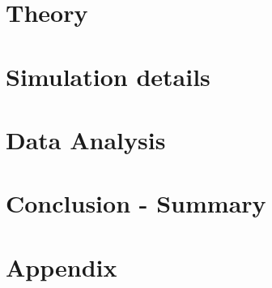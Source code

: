 \documentclass[a4paper, 11pt]{scrreprt}
\begin{document}
	
	\renewcommand{\subsectionautorefname}{section\negthinspace}
	\renewcommand{\subsubsectionautorefname}{section\negthinspace}	\renewcommand{\figureautorefname}{fig.\negthinspace}
	\renewcommand{\tableautorefname}{tab.\negthinspace}
	\renewcommand{\equationautorefname}{eq.\negthinspace}
	
	
	\newcommand{\supervision}{Tanja Schilling}
	\newcommand{\vauthor}{Wilkin Wöhler}
	\newcommand{\vtitle}{Master Thesis}
	\newcommand{\vgroup}{Institute for Soft Matter}
	\newcommand{\vuniversity}{Albert-Ludwigs Universität}
	\newcommand{\vplace}{Freiburg}

	
	
	\newcommand{\presummary}{ A raw writing of hard sphere nucleation, a simulation to measure quantiteis, and a analysis of data generate by means of the simulation. A test citation: \cite{Heyes2007}}


\tableofcontents
\newpage

\listoffigures
\pagebreak

\listoftables
\newpage
{} 

\chapter{Theory}

\newpage

\chapter{Simulation details}

\newpage

\chapter{Data Analysis}

\newpage

\chapter{Conclusion - Summary}

\newpage

\chapter{Appendix}

\newpage

\printbibliography
\end{document}

